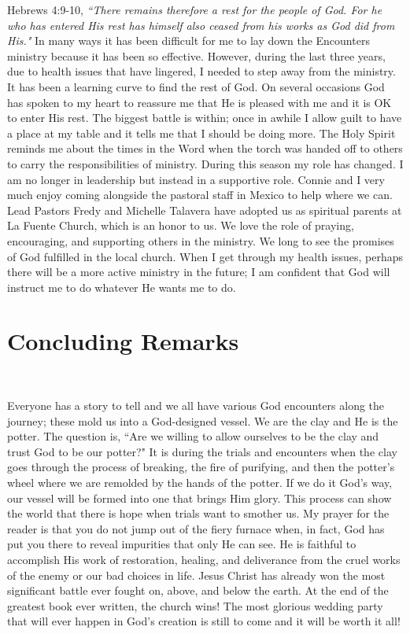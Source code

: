 \documentclass[oneside]{book}
\begin{document}
Hebrews 4:9-10, \textit{``There remains therefore a rest for the people of God. For he who has entered His rest has himself also ceased from his works as God did from His."} In many ways it has been difficult for me to lay down the Encounters ministry because it has been so effective. However, during the last three years, due to health issues that have lingered, I needed to step away from the ministry. It has been a learning curve to find the rest of God. On several occasions God has spoken to my heart to reassure me that He is pleased with me and it is OK to enter His rest. The biggest battle is within; once in awhile I allow guilt to have a place at my table and it tells me that I should be doing more. The Holy Spirit reminds me about the times in the Word when the torch was handed off to others to carry the responsibilities of ministry. During this season my role has changed. I am no longer in leadership but instead in a supportive role. Connie and I very much enjoy coming alongside the pastoral staff in Mexico to help where we can. Lead Pastors Fredy and Michelle Talavera have adopted us as spiritual parents at La Fuente Church, which is an honor to us. We love the role of praying, encouraging, and supporting others in the ministry. We long to see the promises of God fulfilled in the local church. When I get through my health issues, perhaps there will be a more active ministry in the future; I am confident that God will instruct me to do whatever He wants me to do.


\section{Concluding Remarks}
\

Everyone has a story to tell and we all have various God encounters along the journey; these mold us into a God-designed vessel. We are the clay and He is the potter. The question is, ``Are we willing to allow ourselves to be the clay and trust God to be our potter?" It is during the trials and encounters when the clay goes through the process of breaking, the fire of purifying, and then the potter's wheel where we are remolded by the hands of the potter. If we do it God's way, our vessel will be formed into one that brings Him glory. This process can show the world that there is hope when trials want to smother us. My prayer for the reader is that you do not jump out of the fiery furnace when, in fact, God has put you there to reveal impurities that only He can see. He is faithful to accomplish His work of restoration, healing, and deliverance from the cruel works of the enemy or our bad choices in life. Jesus Christ has already won the most significant battle ever fought on, above, and below the earth. At the end of the greatest book ever written, the church wins! The most glorious wedding party that will ever happen in God's creation is still to come and it will be worth it all! 
\end{document}
